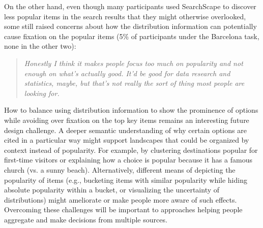 On the other hand, even though many participants used SearchScape to discover less popular items in the search results that they might otherwise overlooked, some still raised concerns about how the distribution information can potentially cause fixation on the popular items (5\% of participants under the Barcelona task, none in the other two):

\blockquote{\emph{Honestly I think it makes people focus too much on popularity and not enough on what's actually good. It'd be good for data research and statistics, maybe, but that's not really the sort of thing most people are looking for.}}

How to balance using distribution information to show the prominence of options while avoiding over fixation on the top key items remains an interesting future design challenge. A deeper semantic understanding of why certain options are cited in a particular way might support landscapes that could be organized by context instead of popularity. For example, by clustering destinations popular for first-time visitors or explaining how a choice is popular because it has a famous church (vs. a sunny beach). Alternatively, different means of depicting the popularity of items (e.g., bucketing items with similar popularity while hiding absolute popularity within a bucket, or visualizing the uncertainty of distributions) might ameliorate or make people more aware of such effects. Overcoming these challenges will be important to approaches helping people aggregate and make decisions from multiple sources.











